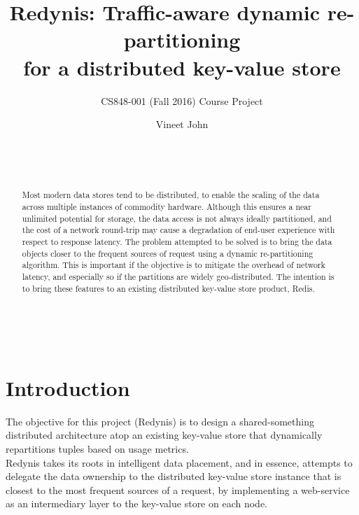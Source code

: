 \documentclass{sig-alternate}
\begin{document}
\title{Redynis: Traffic-aware dynamic re-partitioning\\for a distributed key-value store}
\subtitle{CS848-001 (Fall 2016) Course Project}


\author{
	\alignauthor Vineet John\\
	\\
	\\
	\\
}


\maketitle
\begin{abstract}
Most modern data stores tend to be distributed, to enable the scaling of the data across multiple instances of commodity hardware. Although this ensures a near unlimited potential for storage, the data access is not always ideally partitioned, and the cost of a network round-trip may cause a degradation of end-user experience with respect to response latency. The problem attempted to be solved is to bring the data objects closer to the frequent sources of request using a dynamic re-partitioning algorithm. This is important if the objective is to mitigate the overhead of network latency, and especially so if the partitions are widely geo-distributed. The intention is to bring these features to an existing distributed key-value store product, Redis\cite{redis-website}.\\
\end{abstract}


\\


\section{Introduction}
The objective for this project (Redynis) is to design a shared-something distributed architecture atop an existing key-value store that dynamically repartitions tuples based on usage metrics.\\

Redynis takes its roots in intelligent data placement, and in essence, attempts to delegate the data ownership to the distributed key-value store instance that is closest to the most frequent sources of a request, by implementing a web-service as an intermediary layer to the key-value store on each node.\\
\end{document}
